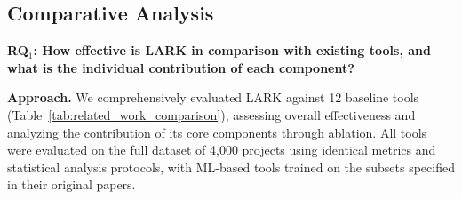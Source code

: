 \begin{comment}
\paragraph{Hallucination Rate} The share of responses containing factually incorrect statements that are not supported by either the knowledge graph or retrieved sources. A response is labeled hallucinated if any material claim lacks support or contradicts ground truth.

\paragraph{Aggregation and Uncertainty} Unless stated otherwise, we micro-average metrics over all projects/pairs. We report 95\% confidence intervals using non-parametric bootstrap with 1{,}000 resamples. Statistical comparisons use paired t-tests and Wilcoxon signed-rank tests with Bonferroni correction where applicable.

\end{comment}

\subsection{Comparative Analysis}

\textbf{RQ$_1$: How effective is LARK in comparison with existing tools, and what is the individual contribution of each component?}

\noindent\textbf{Approach.} We comprehensively evaluated LARK against 12 baseline tools (Table~\ref{tab:related_work_comparison}), assessing overall effectiveness and analyzing the contribution of its core components through ablation.
All tools were evaluated on the full dataset of 4,000 projects using identical metrics and statistical analysis protocols, with ML-based tools trained on the subsets specified in their original papers.

